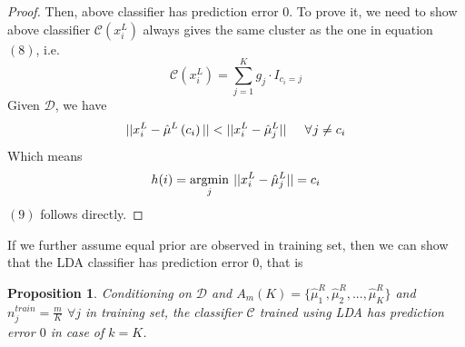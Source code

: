 \documentclass[11pt]{article}
\newtheorem{proposition}{Proposition}
\begin{document}
\begin{proof}
Then, above classifier has prediction error $0$. To prove it, we need to show above classifier $\mathcal{C}(x^L_i)$ always gives the same cluster as the one in equation $(8)$, i.e. 
\begin{equation}
\mathcal{C}(x^L_i) = \sum^K_{j=1} g_j \cdot I_{c_i = j}
\end{equation}
Given $\mathcal{D}$, we have
\[||x^L_i-\hat{\mu}^L \left(c_i\right)|| < ||x^L_i-\hat{\mu}^L_{j}||\hspace{0.2 in}\forall \hspace{0.01 in}j\neq c_i\]
Which means
\[h(i) = \underset{j}{\operatorname{argmin}} \hspace{0.05 in}||x^L_i - \hat{\mu}^L_j|| = c_i \]
$(9)$ follows directly.
\end{proof}
\noindent
If we further assume equal prior are observed in training set, then we can show that the LDA classifier has prediction error $0$, that is
\begin{proposition}
Conditioning on $\mathcal{D}$ and $A_m(K) = \{\hat{\mu}^R_1,\hat{\mu}^R_2,...,\hat{\mu}^R_K \}$ and $n^{train}_j=\frac{m}{K}$ $\forall j$ in training set, the classifier $\mathcal{C}$ trained using LDA has prediction error $0$ in case of $k = K$.
\end{proposition}
\end{document}
